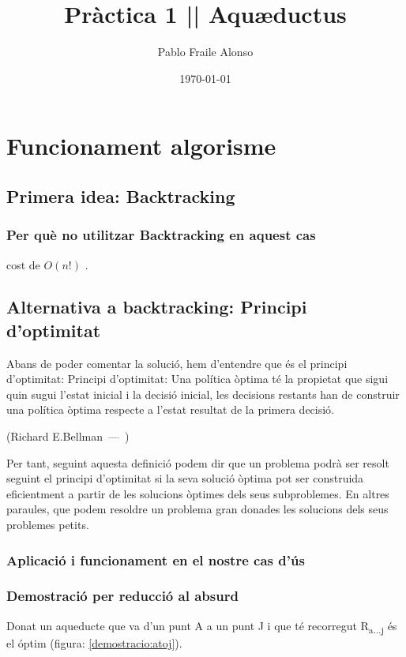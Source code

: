 \documentclass[12pt, letterpaper]{article}
\title{\textbf{Pràctica 1 || Aquæductus}}
\author{Pablo Fraile Alonso}
\date{\today}
\let\oldquote\quote
\let\endoldquote\endquote
\renewenvironment{quote}[2][]
  {\if\relax\detokenize{#1}\relax
     \def\quoteauthor{#2}%
   \else
     \def\quoteauthor{#2~---~#1}%
   \fi
   \oldquote}
  {\par\nobreak\smallskip\hfill(\quoteauthor)%
   \endoldquote\addvspace{\bigskipamount}}
\begin{document}
\maketitle
\thispagestyle{empty}
\newpage
\tableofcontents
\listoffigures
\newpage

\section{Funcionament algorisme}

\subsection{Primera idea: Backtracking}

\subsubsection{Per què no utilitzar Backtracking en aquest cas}
cost de $O(n!)$ .

\subsection{Alternativa a backtracking: Principi d'optimitat}
Abans de poder comentar la solució, hem d'entendre que és el principi d'optimitat: 
\begin{quote}{Richard E.Bellman} Principi d'optimitat: Una política òptima té la propietat que sigui quin sugui l'estat inicial i la decisió inicial, les decisions restants han de construir una política òptima respecte a l'estat resultat de la primera decisió.
\end{quote}

Per tant, seguint aquesta definició podem dir que un problema podrà ser resolt seguint el principi d'optimitat si la seva solució òptima pot ser construida eficientment a partir de les solucions òptimes dels seus subproblemes. En altres paraules, que podem resoldre un problema gran donades les solucions dels seus problemes petits.

\subsubsection{Aplicació i funcionament en el nostre cas d'ús}
\subsubsection{Demostració per reducció al absurd}
Donat un aqueducte que va d'un punt A a un punt J i que té recorregut R\textsubscript{a...j} és el óptim (figura: \ref{demostracio:atoj}).
\end{document}
